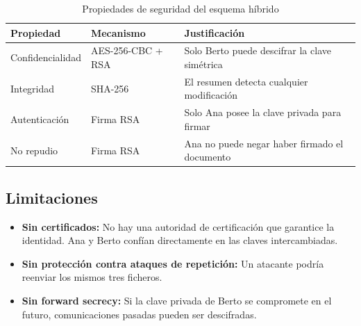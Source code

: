 \begin{table}[H]
    \centering
    \caption{Propiedades de seguridad del esquema híbrido}
    \begin{tabularx}{\textwidth}{l|l|p{6cm}}
        \toprule
        \textbf{Propiedad} & \textbf{Mecanismo} & \textbf{Justificación} \\
        \midrule
        Confidencialidad & AES-256-CBC + RSA & Solo Berto puede descifrar la clave simétrica \\
        Integridad & SHA-256 & El resumen detecta cualquier modificación \\
        Autenticación & Firma RSA & Solo Ana posee la clave privada para firmar \\
        No repudio & Firma RSA & Ana no puede negar haber firmado el documento \\
        \bottomrule
    \end{tabularx}
\end{table}

\subsection{Limitaciones}

\begin{itemize}[label=\textbullet]
    \item \textbf{Sin certificados:} No hay una autoridad de certificación que garantice la identidad. Ana y Berto confían directamente en las claves intercambiadas.
    \item \textbf{Sin protección contra ataques de repetición:} Un atacante podría reenviar los mismos tres ficheros.
    \item \textbf{Sin forward secrecy:} Si la clave privada de Berto se compromete en el futuro, comunicaciones pasadas pueden ser descifradas.
\end{itemize}

